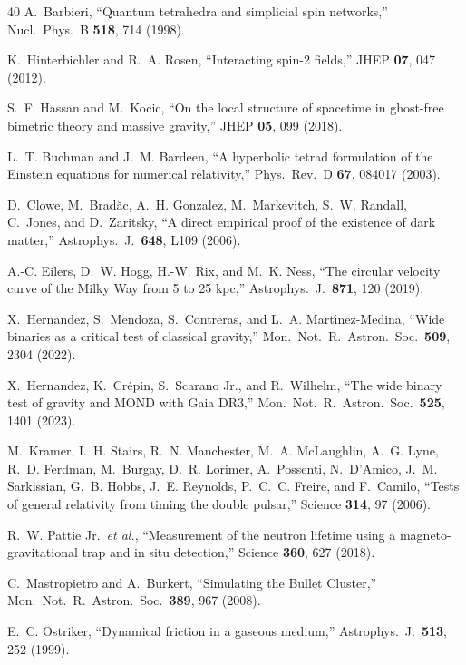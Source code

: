 \documentclass[aps,prd,preprint,superscriptaddress,showpacs,preprintnumbers,amsmath,amssymb,nofootinbib]{revtex4-2}
\begin{document}
\begin{thebibliography}{40}
A.~Barbieri, ``Quantum tetrahedra and simplicial spin networks,'' Nucl.\ Phys.\ B \textbf{518}, 714 (1998).

K.~Hinterbichler and R.~A. Rosen, ``Interacting spin-2 fields,'' JHEP \textbf{07}, 047 (2012).

S.~F. Hassan and M.~Kocic, ``On the local structure of spacetime in ghost-free bimetric theory and massive gravity,'' JHEP \textbf{05}, 099 (2018).

L.~T. Buchman and J.~M. Bardeen, ``A hyperbolic tetrad formulation of the Einstein equations for numerical relativity,'' Phys.\ Rev.\ D \textbf{67}, 084017 (2003).

D.~Clowe, M.~Brad\u{a}c, A.~H. Gonzalez, M.~Markevitch, S.~W. Randall, C.~Jones, and D.~Zaritsky, ``A direct empirical proof of the existence of dark matter,'' Astrophys.\ J.\ \textbf{648}, L109 (2006).

A.-C. Eilers, D.~W. Hogg, H.-W. Rix, and M.~K. Ness, ``The circular velocity curve of the Milky Way from 5 to 25 kpc,'' Astrophys.\ J.\ \textbf{871}, 120 (2019).

X.~Hernandez, S.~Mendoza, S.~Contreras, and L.~A. Mart\'{\i}nez-Medina, ``Wide binaries as a critical test of classical gravity,'' Mon.\ Not.\ R.\ Astron.\ Soc.\ \textbf{509}, 2304 (2022).

X.~Hernandez, K.~Cr\'epin, S.~Scarano Jr., and R.~Wilhelm, ``The wide binary test of gravity and MOND with Gaia DR3,'' Mon.\ Not.\ R.\ Astron.\ Soc.\ \textbf{525}, 1401 (2023).

M.~Kramer, I.~H. Stairs, R.~N. Manchester, M.~A. McLaughlin, A.~G. Lyne, R.~D. Ferdman, M.~Burgay, D.~R. Lorimer, A.~Possenti, N.~D'Amico, J.~M. Sarkissian, G.~B. Hobbs, J.~E. Reynolds, P.~C.~C. Freire, and F.~Camilo, ``Tests of general relativity from timing the double pulsar,'' Science \textbf{314}, 97 (2006).

R.~W. Pattie Jr.\ \textit{et al.}, ``Measurement of the neutron lifetime using a magneto-gravitational trap and in situ detection,'' Science \textbf{360}, 627 (2018).

C.~Mastropietro and A.~Burkert, ``Simulating the Bullet Cluster,'' Mon.\ Not.\ R.\ Astron.\ Soc.\ \textbf{389}, 967 (2008).

E.~C. Ostriker, ``Dynamical friction in a gaseous medium,'' Astrophys.\ J.\ \textbf{513}, 252 (1999).


\end{thebibliography}
\end{document}
